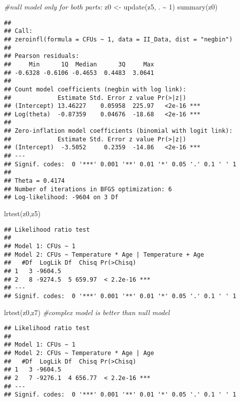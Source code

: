 \documentclass[
]{article}
\newenvironment{Shaded}{\begin{snugshade}}{\end{snugshade}}
\newcommand{\CommentTok}[1]{\textcolor[rgb]{0.56,0.35,0.01}{\textit{#1}}}
\newcommand{\DecValTok}[1]{\textcolor[rgb]{0.00,0.00,0.81}{#1}}
\newcommand{\FunctionTok}[1]{\textcolor[rgb]{0.00,0.00,0.00}{#1}}
\newcommand{\NormalTok}[1]{#1}
\newcommand{\OtherTok}[1]{\textcolor[rgb]{0.56,0.35,0.01}{#1}}
\newcommand{\SpecialCharTok}[1]{\textcolor[rgb]{0.00,0.00,0.00}{#1}}
\begin{document}
\begin{Shaded}
\begin{Highlighting}[]
\CommentTok{\#null model only for both parts:}
\NormalTok{z0 }\OtherTok{\textless{}{-}} \FunctionTok{update}\NormalTok{(z5, . }\SpecialCharTok{\textasciitilde{}} \DecValTok{1}\NormalTok{)}
\FunctionTok{summary}\NormalTok{(z0)}
\end{Highlighting}
\end{Shaded}

\begin{verbatim}
## 
## Call:
## zeroinfl(formula = CFUs ~ 1, data = II_Data, dist = "negbin")
## 
## Pearson residuals:
##     Min      1Q  Median      3Q     Max 
## -0.6328 -0.6106 -0.4653  0.4483  3.0641 
## 
## Count model coefficients (negbin with log link):
##             Estimate Std. Error z value Pr(>|z|)    
## (Intercept) 13.46227    0.05958  225.97   <2e-16 ***
## Log(theta)  -0.87359    0.04676  -18.68   <2e-16 ***
## 
## Zero-inflation model coefficients (binomial with logit link):
##             Estimate Std. Error z value Pr(>|z|)    
## (Intercept)  -3.5052     0.2359  -14.86   <2e-16 ***
## ---
## Signif. codes:  0 '***' 0.001 '**' 0.01 '*' 0.05 '.' 0.1 ' ' 1 
## 
## Theta = 0.4174 
## Number of iterations in BFGS optimization: 6 
## Log-likelihood: -9604 on 3 Df
\end{verbatim}

\begin{Shaded}
\begin{Highlighting}[]
\FunctionTok{lrtest}\NormalTok{(z0,z5)}
\end{Highlighting}
\end{Shaded}

\begin{verbatim}
## Likelihood ratio test
## 
## Model 1: CFUs ~ 1
## Model 2: CFUs ~ Temperature * Age | Temperature + Age
##   #Df  LogLik Df  Chisq Pr(>Chisq)    
## 1   3 -9604.5                         
## 2   8 -9274.5  5 659.97  < 2.2e-16 ***
## ---
## Signif. codes:  0 '***' 0.001 '**' 0.01 '*' 0.05 '.' 0.1 ' ' 1
\end{verbatim}

\begin{Shaded}
\begin{Highlighting}[]
\FunctionTok{lrtest}\NormalTok{(z0,z7) }\CommentTok{\#complex model is better than null model}
\end{Highlighting}
\end{Shaded}

\begin{verbatim}
## Likelihood ratio test
## 
## Model 1: CFUs ~ 1
## Model 2: CFUs ~ Temperature * Age | Age
##   #Df  LogLik Df  Chisq Pr(>Chisq)    
## 1   3 -9604.5                         
## 2   7 -9276.1  4 656.77  < 2.2e-16 ***
## ---
## Signif. codes:  0 '***' 0.001 '**' 0.01 '*' 0.05 '.' 0.1 ' ' 1
\end{verbatim}
\end{document}
